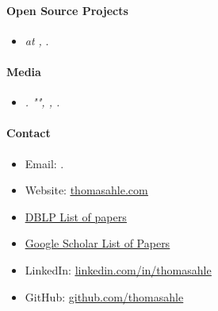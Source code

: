 \documentclass[11pt]{article}
\begin{document}
\paragraph{Open Source Projects}
\begin{itemize}
      \item[]
      \emph{ at , }.
      \\
\end{itemize}


\paragraph{Media}
\begin{itemize}
   \item[]
      \emph{.
         "", , .}
\end{itemize}

\paragraph{Contact}
\begin{itemize}
   \item[]
      Email: \href{mailto:\VAR{authors['thdy'].email}}{}.
   \item[]
      Website: \href{http://www.thomasahle.com}{\underline{thomasahle.com}}
   \item[]
      \href{https://dblp1.uni-trier.de/pers/hd/a/Ahle:Thomas_D=}{\underline{DBLP List of papers}}
   \item[]
      \href{https://scholar.google.dk/citations?user=aRiVoYgAAAAJ}{\underline{Google Scholar List of Papers}}
   \item[]
      LinkedIn: \href{https://www.linkedin.com/in/thomasahle/}{\underline{linkedin.com/in/thomasahle}}
   \item[]
      GitHub: \href{https://github.com/thomasahle}{\underline{github.com/thomasahle}}
\end{itemize}
\end{document}
